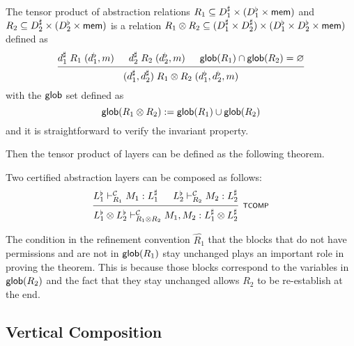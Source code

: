 \documentclass[acmsmall,review,anonymous]{acmart}\settopmatter{printfolios=true,printccs=false,printacmref=false}
\begin{document}
\begin{definition}
  The tensor product of abstraction relations
  $R_1 \subseteq D_1^\sharp \times (D_1^\flat \times  \mathsf{mem} )$
  and
  $R_2 \subseteq D_2^\sharp \times (D_2^\flat \times  \mathsf{mem} )$
  is a relation
  $R_1 \otimes R_2 \subseteq (D_1^\sharp \times D_2^\sharp)
  \times (D_1^\flat \times D_2^\flat \times  \mathsf{mem} )$
  defined as
  \[
    \begin{prooftree}
      \hypo{d_1^\sharp \mathrel{R_1} (d_1^\flat, m)}
      \hypo{d_2^\sharp \mathrel{R_2} (d_2^\flat, m)}
      \hypo{\kw{glob}(R_1) \cap \kw{glob}(R_2) = \varnothing}
      \infer3{(d_1^\sharp,d_2^\sharp)
        \mathrel{R_1\otimes R_2} (d_1^\flat,d_2^\flat,m)}
    \end{prooftree}
  \]
  with the $ \mathsf{glob} $ set defined as
  \[
     \mathsf{glob} (R_1\otimes R_2) :=  \mathsf{glob} (R_1) \cup  \mathsf{glob} (R_2)
  \]
  and it is straightforward to verify
  the invariant property.
\end{definition}

Then the tensor product of layers can be defined
as the following theorem.

\begin{theorem}
  Two certified abstraction layers can be
  composed as follows:
  \[
    \begin{prooftree}
      \hypo{L_1^\flat \vdash^\mathcal{C}_{R_1} M_1 : L_1^\sharp}
      \hypo{L_2^\flat \vdash^\mathcal{C}_{R_2} M_2 : L_2^\sharp}
      \infer2[\scriptsize\kw{TCOMP}]{L_1^\flat \otimes L_2^\flat
        \vdash^\mathcal{C}_{R_1 \otimes R_2}
        M_1, M_2 : L_1^\sharp \otimes L_2^\sharp}
    \end{prooftree}
  \]
\end{theorem}

The condition in the refinement convention $\hat{R_1}$
that the blocks that do not have permissions
and are not in $ \mathsf{glob} (R_1)$ stay unchanged
plays an important role in proving the theorem.
This is because those blocks correspond to
the variables in $ \mathsf{glob} (R_2)$
and the fact that they stay unchanged
allows $R_2$ to be re-establish at the end.


\subsection{Vertical Composition} %
\label{sec:ccal:vcomp}
\end{document}
